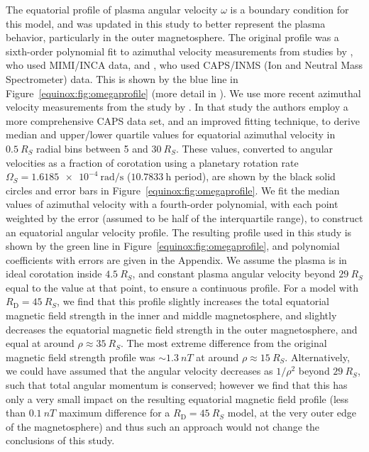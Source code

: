 The equatorial profile of plasma angular velocity $\omega$ is a boundary condition for this model, and was updated in this study to better represent the plasma behavior, particularly in the outer magnetosphere. The original profile was a sixth-order polynomial fit to azimuthal velocity measurements from studies by \citet{kane2008}, who used MIMI/INCA data, and \citet{wilson2008}, who used CAPS/INMS (Ion and Neutral Mass Spectrometer) data. This is shown by the blue line in Figure~\ref{equinox:fig:omegaprofile} (more detail in \citet{achilleos2010a}). We use more recent azimuthal velocity measurements from the study by \citet{wilson2017}. In that study the authors employ a more comprehensive CAPS data set, and an improved fitting technique, to derive median and upper/lower quartile values for equatorial azimuthal velocity in $\SI{0.5}{R_S}$ radial bins between 5 and $\SI{30}{R_S}$. These values, converted to angular velocities as a fraction of corotation using a planetary rotation rate $\Omega_S = \SI{1.6185e-4}{\radian\per\second}$ ($\SI{10.7833}{\hour}$ period), are shown by the black solid circles and error bars in Figure~\ref{equinox:fig:omegaprofile}. We fit the median values of azimuthal velocity with a fourth-order polynomial, with each point weighted by the error (assumed to be half of the interquartile range), to construct an equatorial angular velocity profile. The resulting profile used in this study is shown by the green line in Figure~\ref{equinox:fig:omegaprofile}, and polynomial coefficients with errors are given in the Appendix. We assume the plasma is in ideal corotation inside $\SI{4.5}{R_S}$, and constant plasma angular velocity beyond $\SI{29}{R_S}$ equal to the value at that point, to ensure a continuous profile. For a model with $R_\mathrm{D} = \SI{45}{R_S}$, we find that this profile slightly increases the total equatorial magnetic field strength in the inner and middle magnetosphere, and slightly decreases the equatorial magnetic field strength in the outer magnetosphere, and equal at around $\rho\approx\SI{35}{R_S}$. The most extreme difference from the original magnetic field strength profile was ${\sim}\SI{1.3}{nT}$ at around $\rho\approx\SI{15}{R_S}$. Alternatively, we could have assumed that the angular velocity decreases as $1/\rho^2$ beyond $\SI{29}{R_S}$, such that total angular momentum is conserved; however we find that this has only a very small impact on the resulting equatorial magnetic field profile (less than $\SI{0.1}{nT}$ maximum difference for a $R_\mathrm{D} = \SI{45}{R_S}$ model, at the very outer edge of the magnetosphere) and thus such an approach would not change the conclusions of this study.

